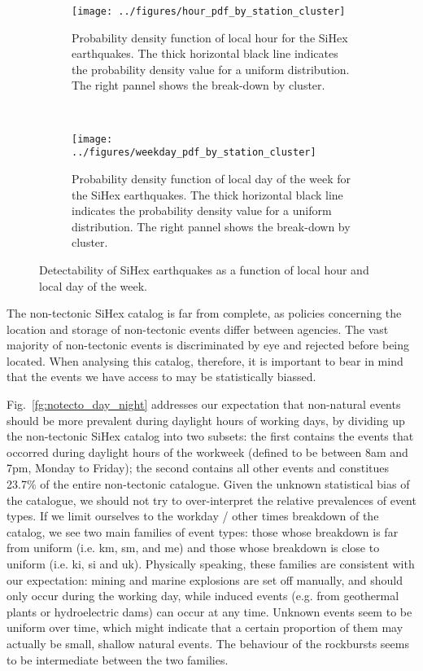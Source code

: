 \begin{figure}
\centering
\begin{subfigure}[t]{\textwidth}
	\centering
	\texttt{[image: ../figures/hour\_pdf\_by\_station\_cluster]}
	\caption{Probability density function of local hour for the SiHex
	earthquakes. The thick horizontal black line indicates the probability
	density value for a uniform distribution.  The right pannel shows the
	break-down by cluster. 
	} 
	\label{fg:detectability_hour}
\end{subfigure}
~
\begin{subfigure}[t]{\textwidth}
	\centering
	\texttt{[image: ../figures/weekday\_pdf\_by\_station\_cluster]}
	\caption{Probability density function of local day of the week for the
	SiHex earthquakes.  The thick horizontal black line indicates the
	probability density value for a uniform distribution.  The right pannel
	shows the break-down by cluster.
	} 
	\label{fg:detectability_day}
\end{subfigure}
\caption{Detectability of SiHex earthquakes as a function of local hour and
local day of the week.}
\label{fg:detectability}
\end{figure}

The non-tectonic SiHex catalog is far from complete, as policies concerning the
location and storage of non-tectonic events differ between agencies. The vast
majority of non-tectonic events is discriminated by eye and rejected before
being located. When analysing this catalog, therefore, it is important to bear
in mind that the events we have access to may be statistically biassed.

Fig.~\ref{fg:notecto_day_night} addresses our expectation that non-natural
events should be more prevalent during daylight hours of working days, by
dividing up the non-tectonic SiHex catalog into two subsets: the first contains
the events that occorred during daylight hours of the workweek (defined to be
between 8am and 7pm, Monday to Friday); the second contains all other
events and constitues 23.7\% of the entire non-tectonic catalogue. Given the
unknown statistical bias of the catalogue, we should not try to over-interpret
the relative prevalences of event types. If we limit ourselves to the workday /
other times breakdown of the catalog, we see two main families of event types:
those whose breakdown is far from uniform (i.e.  km, sm, and me) and those
whose breakdown is close to uniform (i.e. ki, si and
uk). Physically speaking, these families are consistent with our expectation:
mining and marine explosions are set off manually, and should only occur during
the working day, while induced events (e.g. from geothermal plants or
hydroelectric dams) can occur at any time. Unknown events seem to be
uniform over time, which might indicate that a certain proportion of them may
actually be small, shallow natural events. The behaviour of the rockbursts
seems to be intermediate between the two families.


